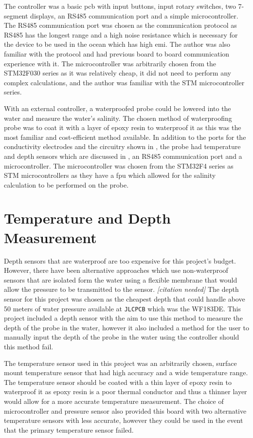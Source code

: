 The controller was a basic \gls{pcb} with input buttons, input rotary switches, two 7-segment displays, an RS485 communication port and a simple microcontroller.
The RS485 communication port was chosen as the communication protocol as RS485 has the longest range and a high noise resistance which is necessary for the device to be used in the ocean which has high \gls{emi}.
The author was also familiar with the protocol and had previous board to board communication experience with it.
The microcontroller was arbitrarily chosen from the STM32F030 series as it was relatively cheap, it did not need to perform any complex calculations, and the author was familiar with the STM microcontroller series.

With an external controller, a waterproofed probe could be lowered into the water and measure the water's salinity.
The chosen method of waterproofing probe was to coat it with a layer of epoxy resin to waterproof it as this was the most familiar and cost-efficient method available.
In addition to the ports for the conductivity electrodes and the circuitry shown in , the probe had temperature and depth sensors which are discussed in , an RS485 communication port and a microcontroller.
The microcontroller was chosen from the STM32F4 series as STM microcontrollers as they have a \gls{fpu} which allowed for the salinity calculation to be performed on the probe.

\section{Temperature and Depth Measurement}\label{sec:temp-depth-measurement}

Depth sensors that are waterproof are too expensive for this project's budget.
However, there have been alternative approaches which use non-waterproof sensors that are isolated form the water using a flexible membrane that would allow the pressure to be transmitted to the sensor. \textit{[citation needed]}
The depth sensor for this project was chosen as the cheapest depth that could handle above 50 meters of water pressure available at \texttt{JLCPCB} which was the WF183DE.
This project included a depth sensor with the aim to use this method to measure the depth of the probe in the water, however it also included a method for the user to manually input the depth of the probe in the water using the controller should this method fail.

The temperature sensor used in this project was an arbitrarily chosen, surface mount temperature sensor that had high accuracy and a wide temperature range.
The temperature sensor should be coated with a thin layer of epoxy resin to waterproof it as epoxy resin is a poor thermal conductor and thus a thinner layer would allow for a more accurate temperature measurement.
The choice of microcontroller and pressure sensor also provided this board with two alternative temperature sensors with less accurate, however they could be used in the event that the primary temperature sensor failed.

